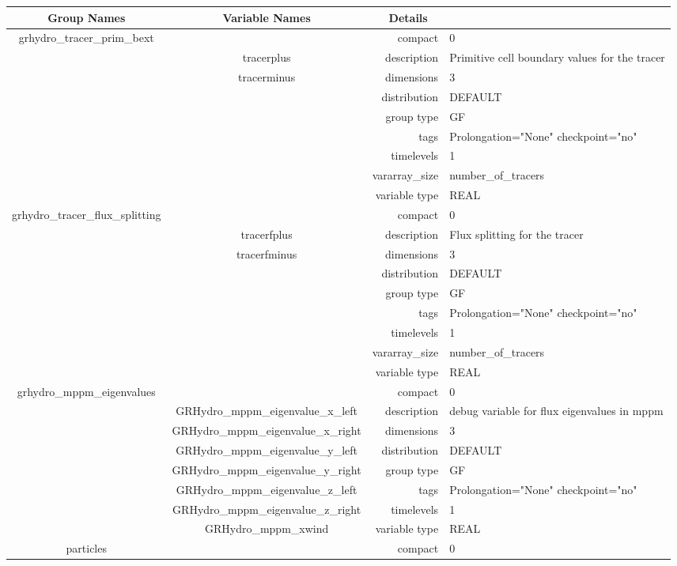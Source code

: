 \documentclass{article}
\begin{document}
\begin{tabular*}{150mm}{|c|c@{\extracolsep{\fill}}|rl|} \hline 
~ {\bf Group Names} ~ & ~ {\bf Variable Names} ~  &{\bf Details} ~ & ~ \\ 
\hline 
grhydro\_tracer\_prim\_bext &  & compact & 0 \\ 
 & tracerplus & description & Primitive cell boundary values for the tracer \\ 
 & tracerminus & dimensions & 3 \\ 
 &  & distribution & DEFAULT \\ 
 &  & group type & GF \\ 
 &  & tags & Prolongation="None" checkpoint="no" \\ 
 &  & timelevels & 1 \\ 
 &  & vararray\_size & number\_of\_tracers \\ 
 &  & variable type & REAL \\ 
\hline 
grhydro\_tracer\_flux\_splitting &  & compact & 0 \\ 
 & tracerfplus & description & Flux splitting for the tracer \\ 
 & tracerfminus & dimensions & 3 \\ 
 &  & distribution & DEFAULT \\ 
 &  & group type & GF \\ 
 &  & tags & Prolongation="None" checkpoint="no" \\ 
 &  & timelevels & 1 \\ 
 &  & vararray\_size & number\_of\_tracers \\ 
 &  & variable type & REAL \\ 
\hline 
grhydro\_mppm\_eigenvalues &  & compact & 0 \\ 
 & GRHydro\_mppm\_eigenvalue\_x\_left & description & debug variable for flux eigenvalues in mppm \\ 
 & GRHydro\_mppm\_eigenvalue\_x\_right & dimensions & 3 \\ 
 & GRHydro\_mppm\_eigenvalue\_y\_left & distribution & DEFAULT \\ 
 & GRHydro\_mppm\_eigenvalue\_y\_right & group type & GF \\ 
 & GRHydro\_mppm\_eigenvalue\_z\_left & tags & Prolongation="None" checkpoint="no" \\ 
 & GRHydro\_mppm\_eigenvalue\_z\_right & timelevels & 1 \\ 
 & GRHydro\_mppm\_xwind & variable type & REAL \\ 
\hline 
particles &  & compact & 0 \\ 

\end{tabular*}
\end{document}
